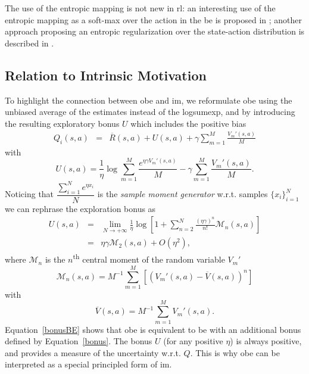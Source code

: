 The use of the entropic mapping is not new in \gls{rl}: an interesting use of the entropic mapping as a soft-max over the action in the \gls{be} is proposed in \cite{pmlr-v70-asadi17a}; another approach proposing an entropic regularization over the state-action distribution is described in \cite{peters2010relative}.

\subsection{Relation to Intrinsic Motivation}
To highlight the connection between \gls{obe} and \gls{im}, we reformulate \gls{obe} using the unbiased average of the estimates instead of the logsumexp, and by introducing the resulting exploratory bonus $U$ which includes the positive bias
\begin{eqnarray}
Q_i(s,a)\! &=&\! \overline{R}(s,a) + U(s,a) +  \gamma  \sum_{m=1}^M \frac{V_m'(s,a)}{M} \label{bonusBE}
\end{eqnarray}
with
\begin{equation}
U(s,a) \! =\!  \frac{1}{\eta}\log\sum_{m=1}^M \frac{e^{\eta\gamma V_m'(s,a)}}{M} - \gamma  \sum_{m=1}^M \frac{V_m'(s,a)}{M}. \label{bonusdef}
\end{equation}
Noticing that $\dfrac{\sum_{i=1}^N e^{\eta x_i}}{N}$ is the \textit{sample moment generator} w.r.t. samples $\{x_i\}_{i=1}^N$ we can rephrase the exploration bonus as
\begin{eqnarray}
U(s,a)& = & \lim_{N \to +\infty}\frac{1}{\eta} \log [  1 + \sum_{n=2}^{N} \frac{(\eta\gamma)^n}{n!}\mathcal{M}_n(s,a)] \nonumber \\
& = & \eta \gamma \mathcal{M}_2(s,a)  + O(\eta^2)\label{bonus},
\end{eqnarray}
where $\mathcal{M}_n$ is the $n$\textsuperscript{th} central moment of the random variable $V_m'$
\begin{equation}
\mathcal{M}_n(s,a) = M^{-1} \sum_{m=1}^M [( V_m'(s,a) -\overline{V}(s,a))^n]\nonumber
\end{equation}
with 
\begin{equation}
\overline{V}(s,a) = M^{-1} \sum_{m=1}^M V_m'(s,a).\nonumber
\end{equation}
Equation~\eqref{bonusBE} shows that \gls{obe} is equivalent to \gls{be} with an additional bonus defined by Equation~\eqref{bonus}. The bonus $U$ (for any positive $\eta$) is always positive, and provides a measure of the uncertainty w.r.t. $Q$. This is why \gls{obe} can be interpreted as a special principled form of \gls{im}.

